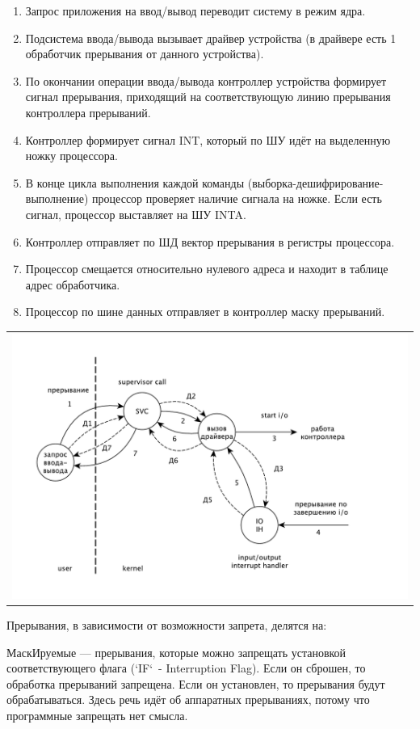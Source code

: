\begin{enumerate}
	\item Запрос приложения на ввод/вывод переводит систему в режим ядра.
	\item Подсистема ввода/вывода вызывает драйвер устройства (в драйвере есть 1 обработчик прерывания от данного устройства).
	\item По окончании операции ввода/вывода контроллер устройства формирует сигнал прерывания, приходящий на соответствующую линию прерывания контроллера прерываний.
	\item Контроллер формирует сигнал INT, который по ШУ идёт на выделенную ножку процессора.
	\item В конце цикла выполнения каждой команды (выборка-дешифрирование-выполнение) процессор проверяет наличие сигнала на ножке. Если есть сигнал, процессор выставляет на ШУ INTA.
	\item Контроллер отправляет по ШД вектор прерывания в регистры процессора.
	\item Процессор смещается относительно нулевого адреса и находит в таблице адрес обработчика.
	\item Процессор по шине данных отправляет в контроллер маску прерываний. 
\end{enumerate}

\begin{table}[H]
  \centering
  \begin{tabular}{p{1\linewidth}}
    \centering
    \includegraphics[width=0.8\linewidth]{./images/driver.pdf}
  \end{tabular}
\end{table}

Прерывания, в зависимости от возможности запрета, делятся на:

МаскИруемые — прерывания, которые можно запрещать установкой соответствующего флага (`IF` - Interruption Flag). Если он сброшен, то обработка прерываний запрещена. Если он установлен, то прерывания будут обрабатываться. Здесь речь идёт об аппаратных прерываниях, потому что программные запрещать нет смысла.

